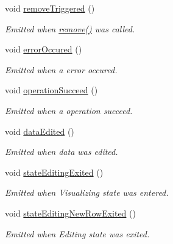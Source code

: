 \begin{DoxyCompactItemize}
void \hyperlink{classmdt_abstract_sql_table_controller_ae76bdc25407f8ed1411919edf5f77b18}{remove\-Triggered} ()
\begin{DoxyCompactList}\small\item\em Emitted when \hyperlink{classmdt_abstract_sql_table_controller_a7bbe0f951403acbcc01c99f5916b9204}{remove()} was called. \end{DoxyCompactList}\item 
void \hyperlink{classmdt_abstract_sql_table_controller_a2cafd348eecc77f2fc0dc05a1a1e69c0}{error\-Occured} ()
\begin{DoxyCompactList}\small\item\em Emitted when a error occured. \end{DoxyCompactList}\item 
void \hyperlink{classmdt_abstract_sql_table_controller_af121cc90bfaf940f1a6a10c5c5a7c7bb}{operation\-Succeed} ()
\begin{DoxyCompactList}\small\item\em Emitted when a operation succeed. \end{DoxyCompactList}\item 
void \hyperlink{classmdt_abstract_sql_table_controller_afa4068a87a3c53a290835115a863f51b}{data\-Edited} ()
\begin{DoxyCompactList}\small\item\em Emitted when data was edited. \end{DoxyCompactList}\item 
void \hyperlink{classmdt_abstract_sql_table_controller_ac164ad9f43047cb2e5c70c2418bd9eb6}{state\-Editing\-Exited} ()
\begin{DoxyCompactList}\small\item\em Emitted when Visualizing state was entered. \end{DoxyCompactList}\item 
void \hyperlink{classmdt_abstract_sql_table_controller_a4fd23a5a2aa859671adc19568f856c36}{state\-Editing\-New\-Row\-Exited} ()
\begin{DoxyCompactList}\small\item\em Emitted when Editing state was exited. \end{DoxyCompactList}\end{DoxyCompactItemize}
